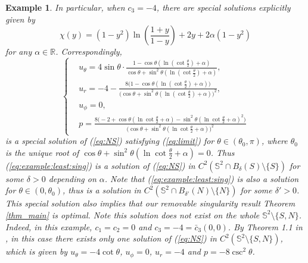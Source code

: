 \documentclass[12pt]{article}
\newtheorem{example}{Example}[section]
\newcommand{\R}{\mathbb{R}}
\begin{document}
\begin{example}
	In particular, when $c_3=-4$, there are special solutions explicitly given by 
	\[
		\chi(y) = (1-y^2) \ln ( \frac{1+y}{1-y} ) + 2y + 2\alpha (1-y^2)
	\]
	for any $\alpha\in \R$. Correspondingly, 
	\begin{equation}\label{eq:example:least:sing}
	\left\{
	\begin{aligned}
		& u_\theta = 4\sin\theta \cdot \frac{ 1 - \cos\theta ( \ln( \cot\frac{ \theta}{2} ) + \alpha ) }{ \cos\theta + \sin^2\theta ( \ln( \cot\frac{ \theta}{2} ) + \alpha ) }, \\
		& u_r = -4 - \frac{ 8 \big( 1 - \cos\theta (\ln( \cot\frac{\theta}{2} ) + \alpha ) \big) }{ \big( \cos\theta + \sin^2\theta (\ln( \cot\frac{ \theta}{2} ) + \alpha ) \big)^2 }, \\
		& u_\phi = 0, \\
		& p = \frac{ 8 \big( - 2 + \cos\theta (\ln\cot\frac{\theta}{2} + \alpha ) - \sin^2\theta ( \ln \cot\frac{\theta}{2} + \alpha )^2 \big) }{ \big( \cos\theta + \sin^2\theta ( \ln \cot\frac{ \theta}{2} + \alpha ) \big)^2 }
	\end{aligned}
	\right.
	\end{equation}
	is a special solution of (\ref{eq:NS}) satisfying (\ref{eq:limit}) for $\theta \in (\theta_0,\pi)$, where $\theta_0$ is the unique root of $\cos\theta + \sin^2\theta ( \ln \cot\frac{ \theta}{2} + \alpha )=0$. Thus (\ref{eq:example:least:sing}) is a solution of (\ref{eq:NS}) in $C^2(\mathbb{S}^2 \cap B_\delta(S)\setminus\{S\})$ for some $\delta>0$ depending on $\alpha$. Note that (\ref{eq:example:least:sing}) is also a solution for $\theta \in (0, \theta_0)$, thus is a solution in $C^2(\mathbb{S}^2 \cap B_{\delta'}(N)\setminus\{N\})$ for some $\delta'>0$. This special solution also implies that our removable singularity result Theorem \ref{thm_main} is optimal. Note this solution does not exist on the whole $\mathbb{S}^2 \setminus\{S,N\}$. Indeed, in this example, $c_1=c_2=0$ and $c_3=-4=\bar{c}_3(0,0)$. By Theorem 1.1 in \cite{LLY2}, in this case there exists only one solution of (\ref{eq:NS}) in $C^2(\mathbb{S}^2 \setminus\{S,N\})$, which is given by $u_{\theta}=-4\cot\theta$, $u_{\phi}=0$, $u_r=-4$ and $p=-8\csc^2\theta$. 


\end{example}
\end{document}
